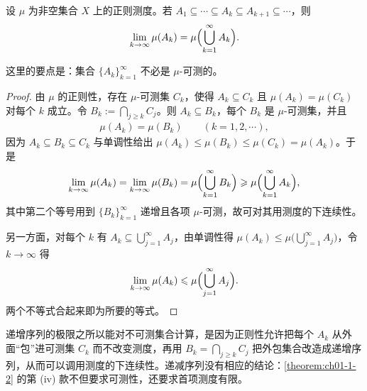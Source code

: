 \documentclass[../../main.tex]{subfiles}
\begin{document}
\begin{theorem}[递增集合]\label{theorem:ch01-1-6}
设 $\mu$ 为非空集合 $X$ 上的正则测度。若 $A_{1}\subseteq\cdots\subseteq A_{k}\subseteq A_{k+1}\subseteq\cdots$，则
\begin{align*}
\lim_{k\to\infty}\mu(A_{k})=\mu\Bigl(\bigcup_{k=1}^{\infty}A_{k}\Bigr).
\end{align*}
\end{theorem}

\begin{remark}\label{remark:ch01-thm-1-6-要点}
这里的要点是：集合 $\{A_{k}\}_{k=1}^{\infty}$ 不必是 $\mu$-可测的。
\end{remark}

\begin{proof}
由 $\mu$ 的正则性，存在 $\mu$-可测集 $C_{k}$，使得 $A_{k}\subseteq C_{k}$ 且 $\mu(A_{k})=\mu(C_{k})$ 对每个 $k$ 成立。令 $B_{k}:=\bigcap_{j\geqslant k}C_{j}$。则 $A_{k}\subseteq B_{k}$，每个 $B_{k}$ 是 $\mu$-可测集，并且
\begin{align*}
\mu(A_{k})=\mu(B_{k})\qquad(k=1,2,\cdots),
\end{align*}
因为 $A_{k}\subseteq B_{k}\subseteq C_{k}$ 与单调性给出 $\mu(A_{k})\leqslant\mu(B_{k})\leqslant\mu(C_{k})=\mu(A_{k})$。于是
\begin{align*}
\lim_{k\to\infty}\mu(A_{k})=\lim_{k\to\infty}\mu(B_{k})=\mu\Bigl(\bigcup_{k=1}^{\infty}B_{k}\Bigr)\geqslant\mu\Bigl(\bigcup_{k=1}^{\infty}A_{k}\Bigr),
\end{align*}
其中第二个等号用到 $\{B_{k}\}_{k=1}^{\infty}$ 递增且各项 $\mu$-可测，故可对其用测度的下连续性。

另一方面，对每个 $k$ 有 $A_{k}\subseteq\bigcup_{j=1}^{\infty}A_{j}$，由单调性得 $\mu(A_{k})\leqslant\mu\bigl(\bigcup_{j=1}^{\infty}A_{j}\bigr)$，令 $k\to\infty$ 得
\begin{align*}
\lim_{k\to\infty}\mu(A_{k})\leqslant\mu\Bigl(\bigcup_{j=1}^{\infty}A_{j}\Bigr).
\end{align*}
两个不等式合起来即为所要的等式。
\end{proof}

\begin{remark}\label{remark:ch01-thm-1-6-动机}
递增序列的极限之所以能对不可测集合计算，是因为正则性允许把每个 $A_{k}$ 从外面“包”进可测集 $C_{k}$ 而不改变测度，再用 $B_{k}=\bigcap_{j\geqslant k}C_{j}$ 把外包集合改造成递增序列，从而可以调用测度的下连续性。递减序列没有相应的结论：\cref{theorem:ch01-1-2} 的第 (iv) 款不但要求可测性，还要求首项测度有限。%
\end{remark}
\end{document}
